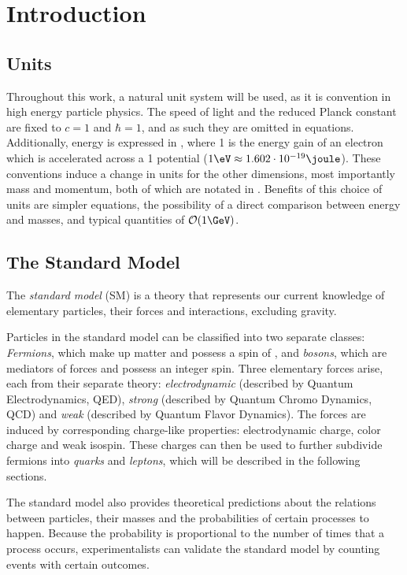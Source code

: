 
\chapter{Introduction}

\section{Units}
Throughout this work, a natural unit system will be used, as it is convention in high energy particle physics. The speed of light and the reduced Planck constant are fixed to $c = 1$ and $\hbar = 1$, and as such they are omitted in equations. Additionally, energy is expressed in \GeV, where \unit{1}{\GeV} is the energy gain of an electron which is accelerated across a \unit{1}{\giga\volt} potential ($\unit{1}{\eV} \approx \unit{1.602 \e{-19}}{\joule}$). These conventions induce a change in units for the other dimensions, most importantly mass and momentum, both of which are notated in \GeV. Benefits of this choice of units are simpler equations, the possibility of a direct comparison between energy and masses, and typical quantities of $\order{\unit{1}{\GeV}}$.

\section{The Standard Model}
The \emph{standard model} (SM) is a theory that represents our current knowledge of elementary particles, their forces and interactions, excluding gravity. 

Particles in the standard model can be classified into two separate classes: \emph{Fermions}, which make up matter and possess a spin of , and \emph{bosons}, which are mediators of forces and possess an integer spin.
Three elementary forces arise, each from their separate theory: \emph{electrodynamic} (described by Quantum Electrodynamics, QED), \emph{strong} (described by Quantum Chromo Dynamics, QCD) and \emph{weak} (described by Quantum Flavor Dynamics). The forces are induced by corresponding charge-like properties: electrodynamic charge, color charge and weak isospin. These charges can then be used to further subdivide fermions into \emph{quarks} and \emph{leptons}, which will be described in the following sections. 

The standard model also provides theoretical predictions about the relations between particles, their masses and the probabilities of certain processes to happen. Because the probability is proportional to the number of times that a process occurs, experimentalists can validate the standard model by counting events with certain outcomes.

